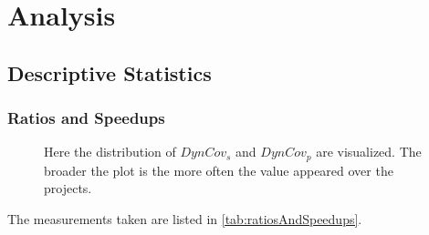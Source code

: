 \chapter{Analysis}
\section{Descriptive Statistics}
\subsection{Ratios and Speedups}
\begin{figure}[!h]
    \caption[Comparison of the distribution of \(DynCov_s\) and \(DynCov_p\)]{
        Here the distribution of \(DynCov_s\) and \(DynCov_p\) are visualized.
        The broader the plot is the more often the value appeared over the projects.
    }
    
\end{figure}
The measurements taken are listed in \autoref{tab:ratiosAndSpeedups}.
